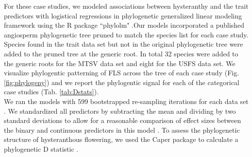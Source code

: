 \documentclass[12pt]{article}\usepackage[]{graphicx}\usepackage[]{color}
\begin{document}
\noindent For these case studies, we modeled associations between hysteranthy and the trait predictors with logistical regressions in phylogenetic generalized linear modeling framework \citep{Ives2010} using the R package ``phylolm" \citep{Ho2014}.Our models incorporated a published angiosperm phylogenetic tree \citep{Zanne2013} pruned to match the species list for each case study. Species found in the trait data set but not in the original phylogenetic tree were added to the pruned tree at the generic root. In total 32 species were added to the generic roots for the MTSV data set and eight for the USFS data set. We visualize phylogentic patterning of FLS across the tree of each case study (Fig. \ref{fig:phylogeny}) and we report the phylogentic signal for each of the categorical case studies (Tab. \ref{tab:Dstats}).\\

\noindent We ran the models with 599 bootstrapped re-sampling iterations for each data set \citep{Wilcox2010}. We standardized all predictors by subtracting the mean and dividing by two standard deviations to allow for a reasonable comparison of effect sizes between the binary and continuous predictors in this model \citep{Gelman2007}. To assess the phylogenetic structure of hysteranthous flowering, we used the Caper package \citep{Orme2013} to calculate a phylogenetic D statistic \citep{}.\\
\end{document}

